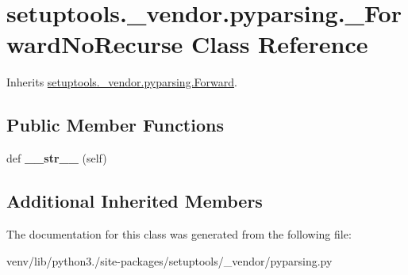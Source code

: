 \hypertarget{classsetuptools_1_1__vendor_1_1pyparsing_1_1___forward_no_recurse}{}\section{setuptools.\+\_\+vendor.\+pyparsing.\+\_\+\+Forward\+No\+Recurse Class Reference}
\label{classsetuptools_1_1__vendor_1_1pyparsing_1_1___forward_no_recurse}


Inherits \hyperlink{classsetuptools_1_1__vendor_1_1pyparsing_1_1_forward}{setuptools.\+\_\+vendor.\+pyparsing.\+Forward}.

\subsection*{Public Member Functions}
\begin{DoxyCompactItemize}
\item 
\mbox{\label{classsetuptools_1_1__vendor_1_1pyparsing_1_1___forward_no_recurse_ad1f9ffd161fff4f8fa5e81a396967f5b}} 
def {\bfseries \+\_\+\+\_\+str\+\_\+\+\_\+} (self)
\end{DoxyCompactItemize}
\subsection*{Additional Inherited Members}


The documentation for this class was generated from the following file\+:\begin{DoxyCompactItemize}
\item 
venv/lib/python3./site-\/packages/setuptools/\+\_\+vendor/pyparsing.\+py\end{DoxyCompactItemize}

